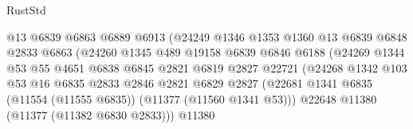 \begin{lexlean}{RustStd}
\begin{coremodule}
                                      @13
                                      @6839
                                      @6863
                                      @6889
                                      @6913
                                      (@24249
                                        @1346
                                        @1353
                                        @1360
                                        @13
                                        @6839
                                        @6848
                                        @2833
                                        @6863
                                        (@24260
                                          @1345
                                          @489
                                          @19158
                                          @6839
                                          @6846
                                          @6188
                                          (@24269
                                            @1344
                                            @53
                                            @55
                                            @4651
                                            @6838
                                            @6845
                                            @2821
                                            @6819
                                            @2827
                                            @22721
                                            (@24268
                                              @1342
                                              @103
                                              @53
                                              @16
                                              @6835
                                              @2833
                                              @2846
                                              @2821
                                              @6829
                                              @2827
                                              (@22681
                                                @1341
                                                @6835
                                                (@11554 (@11555 @6835))
                                                (@11377 (@11560 @1341 @53)))
                                              @22648
                                              @11380
                                              (@11377 (@11382 @6830 @2833)))
                                            @11380

\end{coremodule}
\end{lexlean}
